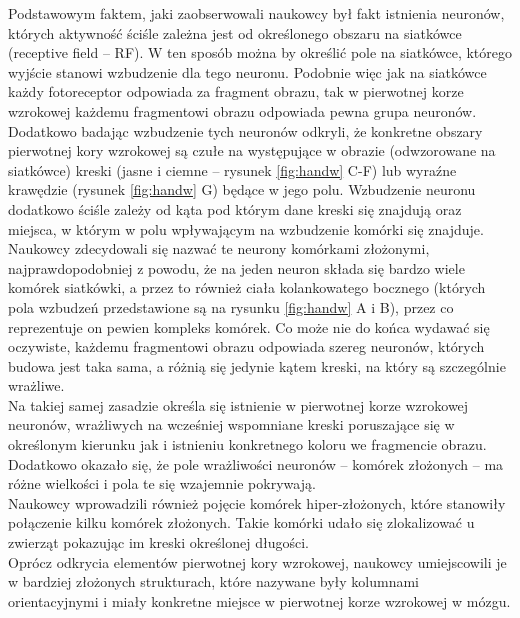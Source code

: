 Podstawowym faktem, jaki zaobserwowali naukowcy był fakt istnienia neuronów, których aktywność ściśle zależna jest od określonego obszaru na siatkówce (receptive field -- RF). W ten sposób można by określić pole na siatkówce, którego wyjście stanowi wzbudzenie dla tego neuronu. Podobnie więc jak na siatkówce każdy fotoreceptor odpowiada za fragment obrazu, tak w pierwotnej korze wzrokowej każdemu fragmentowi obrazu odpowiada pewna grupa neuronów. Dodatkowo badając wzbudzenie tych neuronów odkryli, że konkretne obszary pierwotnej kory wzrokowej są czułe na występujące w obrazie (odwzorowane na siatkówce) kreski (jasne i ciemne -- rysunek \ref{fig:handw} C-F) lub wyraźne krawędzie (rysunek \ref{fig:handw} G) będące w jego polu. Wzbudzenie neuronu dodatkowo ściśle zależy od kąta pod którym dane kreski się znajdują oraz miejsca, w którym w polu wpływającym na wzbudzenie komórki się znajduje. Naukowcy zdecydowali się nazwać te neurony komórkami złożonymi, najprawdopodobniej z powodu, że na jeden neuron składa się bardzo wiele komórek siatkówki, a przez to również ciała kolankowatego bocznego (których pola wzbudzeń przedstawione są na rysunku \ref{fig:handw} A i B), przez co reprezentuje on pewien kompleks komórek. Co może nie do końca wydawać się oczywiste, każdemu fragmentowi obrazu odpowiada szereg neuronów, których budowa jest taka sama, a różnią się jedynie kątem kreski, na który są szczególnie wrażliwe.\\

Na takiej samej zasadzie określa się istnienie w pierwotnej korze wzrokowej neuronów, wrażliwych na wcześniej wspomniane kreski poruszające się w określonym kierunku jak i istnieniu konkretnego koloru we fragmencie obrazu. Dodatkowo okazało się, że pole wrażliwości neuronów -- komórek złożonych -- ma różne wielkości i pola te się wzajemnie pokrywają. \\

Naukowcy wprowadzili również pojęcie komórek hiper-złożonych, które stanowiły połączenie kilku komórek złożonych. Takie komórki udało się zlokalizować u zwierząt pokazując im kreski określonej długości.\\

Oprócz odkrycia elementów pierwotnej kory wzrokowej, naukowcy umiejscowili je w bardziej złożonych strukturach, które nazywane były kolumnami orientacyjnymi i miały konkretne miejsce w pierwotnej korze wzrokowej w mózgu.

